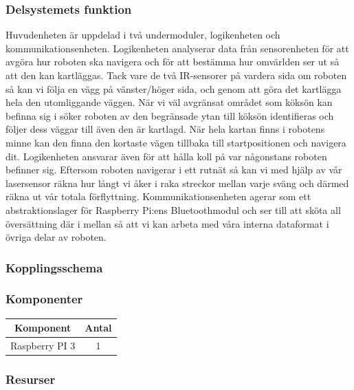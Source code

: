 \documentclass{article}
\begin{document}
\subsubsection{Delsystemets funktion}

Huvudenheten är uppdelad i två undermoduler, logikenheten och kommunikationsenheten. Logikenheten analyserar data från sensorenheten för att avgöra hur roboten ska navigera och för att bestämma hur omvärlden ser ut så att den kan kartläggas. Tack vare de två IR-sensorer på vardera sida om roboten så kan vi följa en vägg på vänster/höger sida, och genom att göra det kartlägga hela den utomliggande väggen. När vi väl avgränsat området som köksön kan befinna sig i söker roboten av den begränsade ytan till köksön identifieras och följer dess väggar till även den är kartlagd. När hela kartan finns i robotens minne kan den finna den kortaste vägen tillbaka till startpositionen och navigera dit. Logikenheten ansvarar även för att hålla koll på var någonstans roboten befinner sig. Eftersom roboten navigerar i ett rutnät så kan vi med hjälp av vår lasersensor räkna hur långt vi åker i raka streckor mellan varje sväng och därmed räkna ut vår totala förflyttning. Kommunikationsenheten agerar som ett abstraktionslager för Raspberry Pi:ens Bluetoothmodul och ser till att sköta all översättning där i mellan så att vi kan arbeta med våra interna dataformat i övriga delar av roboten.


\subsubsection{Kopplingsschema}

\subsubsection{Komponenter}

\begin{table}[H]
   \centering
  \begin{tabular}{ | c | c | }
    \hline
    \textbf{Komponent} & \textbf{Antal} \\
    \hline
    Raspberry PI 3 & 1 \\
    \hline
  \end{tabular}
\end{table}

\subsubsection{Resurser}
\end{document}
